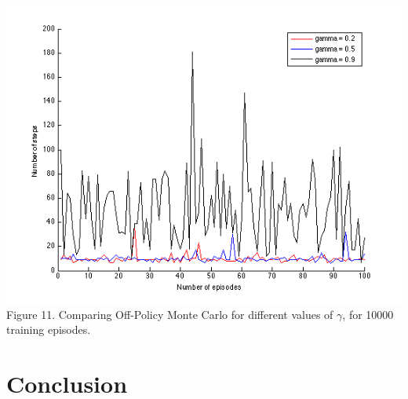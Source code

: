 \documentclass[a4paper,11pt]{article}
\begin{document}
\begin{center}
\includegraphics[width=1.0\textwidth,height=0.4\textheight]{offpolicygamma.png}
\label{Figure 1}
Figure 11. Comparing Off-Policy Monte Carlo for different values of $\gamma$, for 10000 training episodes.
\end{center}

\section*{Conclusion}
\end{document}
